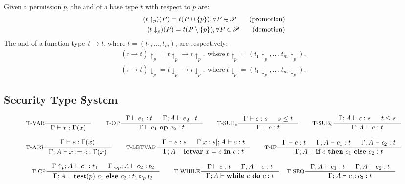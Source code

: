 {{{\begin{definition}\label{def:updown}
Given a permission $p$, the  and  of a base type $t$
with respect to $p$ are: \begin{align*}
(t\uparrow_{p}) (P) = t(P\cup \{p\}), \forall P\in \!\mathscr{P}\!
\tag{promotion}
\\
(t\downarrow_{p}) (P) = t(P\setminus\{p\}), \forall P\in \!\mathscr{P}\!
\tag{demotion}
\end{align*}
The  and  of a function type~$\overline{t}\rightarrow t$,
where $\overline{t} = (t_1,\dots, t_m)$, are respectively:
\begin{align*}
(\overline{t}\rightarrow t)\uparrow_{p} = \overline{t}\uparrow_{p} \rightarrow t\uparrow_{p},~
\text{where}~\overline{t}\uparrow_{p} = (t_1\uparrow_{p},\ldots, t_m\uparrow_{p}),
\\
(\overline{t}\rightarrow t)\downarrow_{p} = \overline{t}\downarrow_{p}\rightarrow t\downarrow_{p},~
\text{where}~\overline{t}\downarrow_{p} = (t_1\downarrow_{p},\ldots, t_m\downarrow_{p}).
\end{align*}
\end{definition}








\subsection{Security Type System}\label{sec:typing_rules}


\begin{figure*}
\tiny
\[
\inference[T-VAR]{}
{\Gamma \vdash \leVAR{x} : \Gamma(x)}
\qquad
\inference[T-OP]
{\Gamma\vdash e_1: t & \Gamma ; A\vdash e_2: t}
{\Gamma\vdash \leOP{e_1}{e_2} : t}
\qquad
\inference[T-SUB$_{e}$]
{\Gamma\vdash e : s & s \leq t}
{\Gamma\vdash e : t}
\qquad
\inference[T-SUB$_{c}$]
{\Gamma; A \vdash c : s & t \leq s}
{\Gamma; A\vdash c : t}
\]

\[
\inference[T-ASS]
{\Gamma \vdash e : \Gamma(x)}
{\Gamma ;A \vdash \lcASS{x}{e} : \Gamma(x)}
\qquad
\inference[T-LETVAR]
{\Gamma \vdash e : s &
\Gamma[x:s]; A \vdash c : t }
{\Gamma; A\vdash \lcLETVAR{x}{e}{c} :  t}
\qquad
\inference[T-IF]
{\Gamma \vdash e : t & \Gamma ; A\vdash c_1 : t & \Gamma; A \vdash c_2 : t }
{\Gamma; A \vdash \lcIF{e}{c_1}{c_2} : t}
\]

\[
\inference[T-CP]
{\Gamma\uparrow_{p} ; A \vdash c_1 : t_1 &
\Gamma\downarrow_{p} ; A\vdash c_2 : t_2}
{\Gamma; A\vdash \lcCP{p}{c_1}{c_2} : \omerge p {t_1} {t_2}}
\qquad
\inference[T-WHILE]
{\Gamma \vdash e : t & \Gamma ; A\vdash c : t  }
{\Gamma; A \vdash \lcWHILE{e}{c} : t }
\quad
\inference[T-SEQ]
{\Gamma; A\vdash c_1 : t & \Gamma ; A\vdash c_2 : t }
{\Gamma ; A\vdash \lcSEQ{c_1}{c_2} : t}
\]


\end{figure*}}}}
